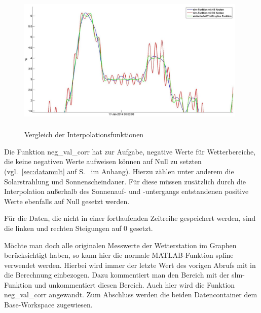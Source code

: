 \begin{figure}[!h]
\centering
\includegraphics[width=11cm,height=7cm]{programm/slmvergleich}
\caption{Vergleich der Interpolationsfunktionen}
\label{fig:intvergleich}
\end{figure} 
Die Funktion \textsf{neg\_val\_corr} hat zur Aufgabe, negative Werte für Wetterbereiche, die keine negativen Werte aufweisen können auf Null zu setzten (vgl.~\ref{sec:datamult} auf S.~\pageref{sec:datamult} im Anhang). Hierzu zählen unter anderem die Solarstrahlung und Sonnenscheindauer. Für diese müssen zusätzlich durch die Interpolation außerhalb des Sonnenauf- und -untergangs entstandenen positive Werte ebenfalls auf Null gesetzt werden.

Für die Daten, die nicht in einer fortlaufenden Zeitreihe gespeichert werden, sind die linken und rechten Steigungen auf 0 gesetzt.   

Möchte man doch alle originalen Messwerte der Wetterstation im Graphen berücksichtigt haben, so kann hier die normale MATLAB-Funktion \textsf{spline} verwendet werden. Hierbei wird immer der letzte Wert des vorigen Abrufs mit in die Berechnung einbezogen. Dazu kommentiert man den Bereich mit der slm-Funktion und unkommentiert diesen Bereich. Auch hier wird die Funktion \textsf{neg\_val\_corr} angewandt. Zum Abschluss werden die beiden Datencontainer dem Base-Workspace zugewiesen. 
   